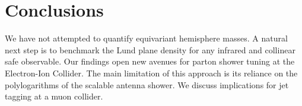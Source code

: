\section{Conclusions}\label{sec:conclusions}

We have not attempted to quantify equivariant hemisphere masses. A
natural next step is to benchmark the Lund plane density for any
infrared and collinear safe observable. Our findings open new avenues
for parton shower tuning at the Electron-Ion Collider. The main
limitation of this approach is its reliance on the polylogarithms of the
scalable antenna shower. We discuss implications for jet tagging at a
muon collider.

